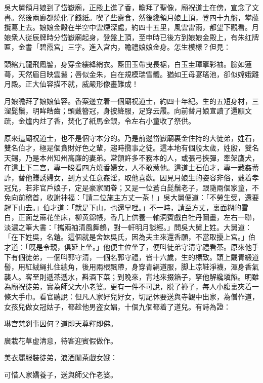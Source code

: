 吳大舅領月娘到了岱嶽廟，正殿上進了香，瞻拜了聖像，廟祝道士在傍，宣念了文書。然後兩廊都燒化了錢紙。喫了些齋食，然後纔領月娘上頂，登四十九盤，攀藤攬葛上去。娘娘金殿在半空中雲煙深處，約四十五里，風雲雷雨，都望下觀看。月娘衆人従辰牌時分岱嶽廟起身，登盤上頂，至申時已後方到娘娘金殿上，有朱红牌匾，金書「碧霞宫」三字。進入宫内，瞻禮娘娘金身。怎生模樣？但見：

\begin{myquote}
頭綰九龍飛鳳髻，身穿金縷絳綃衣。藍田玉帶曳長裾，白玉圭璋擎彩袖。臉如蓮蕚，天然眉目映雲鬟；唇似金朱，自在規模瑞雪體。猶如王母宴瑤池，卻似嫦娥離月殿。正大仙容描不就，威嚴形像畫難成！
\end{myquote}

月娘瞻拜了娘娘仙容。香案邊立着一個廟祝道士，約四十年紀。生的五短身材，三溜髭鬚，明眸皓齒；頭戴簪冠，身披絳服，足穿云履。向前替月娘宣讀了還願文疏，金爐内炷了香，焚化了紙馬金銀，令左右小童收了祭供。

原來這廟祝道士，也不是個守本分的。乃是前邊岱嶽廟裏金住持的大徒弟，姓石，雙名伯才，極是個貪財好色之輩，趨時攬事之徒。這本地有個殷太歲，姓殷，雙名天錫，乃是本州知州高廉的妻弟。常領許多不務本的人，或張弓挾彈，牽架鷹犬，在這上下二宫，專一睃看四方燒香婦女，人不敢惹他。這道士石伯才，專一藏姦蓄詐，替他賺誘婦女，到方丈任意姦淫，取他喜歡。因見月娘生的姿容非俗，戴着孝冠兒，若非官戶娘子，定是豪家閨眷；又是一位蒼白髭鬚老子，跟隨兩個家童，不免向前稽首，收謝神福：「請二位施主方丈一茶！」吳大舅便道：「不勞生受，還要趕下山去。」伯才道：「就是下山，也還早哩。」不一時，請至方丈，裏面糊的雪白，正面芝蔴花坐床，柳黄錦帳，香几上供養一軸洞賓戲白牡丹圖畫，左右一聯，淡濃之筆大書：「攜兩袖清風舞鶴，對一軒明月談經。」問吳大舅上姓。大舅道：「在下姓吳，名鎧。這個就是舍妹吳氏，因為夫主來還香願，不當取擾上宫。」伯才道：「旣是令親，俱延上坐。」他便主位坐了，便呌徒弟守清守禮看茶。原來他手下有個徒弟，一個呌郭守清，一個名郭守禮，皆十六歲，生的標致。頭上戴青緞道髻，用紅絨䋲扎住總角，後用兩根飄帶，身穿青絹道服，脚上凉鞋淨襪，渾身香氣襲人。客至則遞茶遞水，斟酒下菜；到晚來，背地來掇箱子，拏他解纔塡餡。明雖為廟祝徒弟，實為師父大小老婆。更有一件不可說，脱了褲子，每人小腹裏夾着一條大手巾。看官聽說：但凡人家好兒好女，切記休要送與寺觀中出家，為僧作道，女孩兒做女冠姑子，都趁他男盗女娼，十個九個都着了道兒。有詩為證：

\begin{myquote}
琳宫梵刹事因何？道即天尊釋即佛。

廣栽花草虚清意，待客迎賓假做作。

美衣麗服裝徒弟，浪酒閒茶戯女娥：

可惜人家嬌養子，送與師父作老婆。
\end{myquote}

